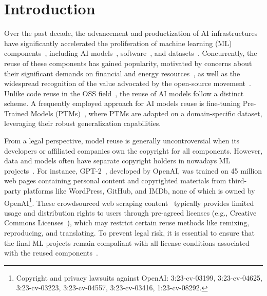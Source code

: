 \section{Introduction}
Over the past decade, the advancement and productization of AI infrastructures have significantly accelerated the proliferation of machine learning (ML) components~\cite{jiang2023empirical}, including AI models~\cite{rombach2022high, touvron2023llama}, software~\cite{wolf2020transformers, he2022fastermoe}, and datasets~\cite{gao2020the, schuhmann2022laion}.
Concurrently, the reuse of these components has gained popularity, motivated by concerns about their significant demands on financial and energy resources~\cite{strubell2019energy}, as well as the widespread recognition of the value advocated by the open-source movement~\cite{rosen2005open}.
Unlike code reuse in the OSS field~\cite{perens1999open}, the reuse of AI models follow a distinct scheme.
A frequently employed approach for AI models reuse is fine-tuning Pre-Trained Models (PTMs)~\cite{han2021pre, touvron2023llama}, where PTMs are adapted on a domain-specific dataset, leveraging their robust generalization capabilities. 

From a legal perspective, model reuse is generally uncontroversial when its developers or affiliated companies own the copyright for all components.
However, data and models often have separate copyright holders in nowadays ML projects~\cite{rajbahadur2021can, radford2019language, scao2022bloom, zeng2023glm}.
For instance, GPT-2~\cite{radford2019language}, developed by OpenAI, was trained on 45 million web pages containing personal content and copyrighted materials from third-party platforms like WordPress, GitHub, and IMDb, none of which is owned by OpenAI\footnote{Copyright and privacy lawsuits against OpenAI: 3:23-cv-03199, 3:23-cv-04625, 3:23-cv-03223, 3:23-cv-04557, 3:23-cv-03416, 1:23-cv-08292.}. %
These crowdsourced web scraping content~\cite{wang2023easyspider} typically provides limited usage and distribution rights to users through pre-agreed licenses (e.g., Creative Commons Licenses~\cite{creative2023list}), which may restrict certain reuse methods like remixing, reproducing, and translating. 
To prevent legal risk, it is essential to ensure that the final ML projects remain compaliant with all license conditions associated with the reused components~\cite{cui2023empirical, mathur2012empirical, kapitsaki2017automating}.

